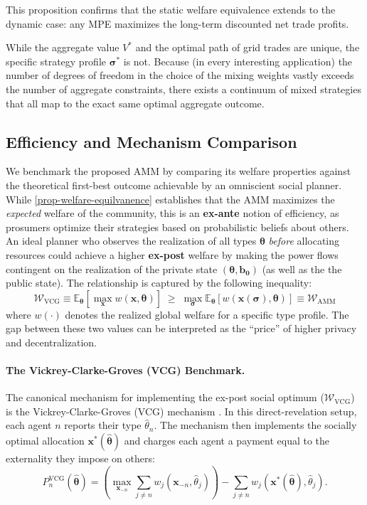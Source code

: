 \documentclass[12pt, notitlepage]{article}
\begin{document}
This proposition confirms that the static welfare equivalence extends to the dynamic case: any MPE maximizes the long-term discounted net trade profits. 

While the aggregate value $V^*$ and the optimal path of grid trades are unique, the specific strategy profile $\boldsymbol{\sigma}^*$ is not. Because (in every interesting application) the number of degrees of freedom in the choice of the mixing weights  vastly exceeds the number of aggregate constraints, there exists a continuum of mixed strategies that all map to the exact same optimal aggregate outcome.
 



\subsection{Efficiency and Mechanism Comparison}
\label{sec:mechanism_comparison}

We benchmark the proposed AMM by comparing its welfare properties against the theoretical first-best outcome achievable by an omniscient social planner. While \cref{prop-welfare-equilvanence} establishes that the AMM maximizes the \textit{expected} welfare of the community, this is an \textbf{ex-ante} notion of efficiency, as prosumers optimize their strategies based on probabilistic beliefs about others. An ideal planner who observes the realization of all types $\boldsymbol{\theta}$ \textit{before} allocating resources could achieve a higher \textbf{ex-post} welfare by making the power flows contingent on the realization of the private state $(\boldsymbol{\theta}, \boldsymbol{b_0})$ (as well as the the public state). The relationship is captured by the following inequality:
\begin{equation}
\label{eq:welfare_hierarchy}
\mathcal{W}_{\text{VCG}} \equiv \mathbb{E}_{\boldsymbol{\theta}} \left[ \max_{\mathbf{x}} w(\mathbf{x}, \boldsymbol{\theta}) \right] \;\ge\; \max_{\boldsymbol{\sigma}} \mathbb{E}_{\boldsymbol{\theta}} \left[ w(\mathbf{x}(\boldsymbol{\sigma}), \boldsymbol{\theta}) \right] \equiv \mathcal{W}_{\text{AMM}}
\end{equation}
where $w(\cdot)$ denotes the realized global welfare for a specific type profile. The gap between these two values can be interpreted as the ``price'' of higher privacy and decentralization.

\paragraph{The Vickrey-Clarke-Groves (VCG) Benchmark.}
The canonical mechanism for implementing the ex-post social optimum ($\mathcal{W}_{\text{VCG}}$) is the Vickrey-Clarke-Groves (VCG) mechanism \citep{vickrey1961, clarke1971, groves1973}. In this direct-revelation setup, each agent $n$ reports their type $\hat{\theta}_n$. The mechanism then implements the socially optimal allocation $\mathbf{x}^*(\hat{\boldsymbol{\theta}})$ and charges each agent a payment equal to the externality they impose on others:
\[
P_n^{\text{VCG}}(\hat{\boldsymbol{\theta}}) = \left( \max_{\mathbf{x}_{-n}} \sum_{j \neq n} w_j(\mathbf{x}_{-n}, \hat{\theta}_j) \right) - \sum_{j \neq n} w_j(\mathbf{x}^*(\hat{\boldsymbol{\theta}}), \hat{\theta}_j).
\]
\end{document}
